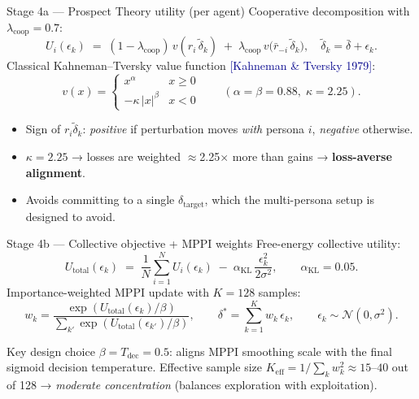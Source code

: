 \documentclass[10pt,aspectratio=169]{beamer}
\newcommand{\cit}[1]{{\scriptsize\textcolor{darkblue}{[#1]}}}
\begin{document}
\begin{frame}{Stage 4a — Prospect Theory utility (per agent)}
  Cooperative decomposition with $\lambda_\text{coop}=0.7$:
  \[
    U_i(\epsilon_k) \;=\; (1-\lambda_\text{coop})\,v(r_i\,\tilde\delta_k)
    \;+\; \lambda_\text{coop}\,v\!\bigl(\bar r_{-i}\,\tilde\delta_k\bigr),\quad
    \tilde\delta_k = \bar\delta + \epsilon_k.
  \]
  Classical Kahneman--Tversky value function \cit{Kahneman \& Tversky 1979}:
  \[
    v(x) =
    \begin{cases}
      x^\alpha & x\ge 0 \\
      -\kappa\,|x|^\beta & x < 0
    \end{cases}
    \qquad (\alpha=\beta=0.88,\;\kappa=2.25).
  \]
  \begin{itemize}
    \item Sign of $r_i\tilde\delta_k$: \emph{positive} if perturbation moves \emph{with} persona $i$, \emph{negative} otherwise.
    \item $\kappa = 2.25$ → losses are weighted $\approx$2.25$\times$ more than gains → \textbf{loss-averse alignment}.
    \item Avoids committing to a single $\delta_\text{target}$, which the multi-persona setup is designed to avoid.
  \end{itemize}
\end{frame}

\begin{frame}{Stage 4b — Collective objective + MPPI weights}
  Free-energy collective utility:
  \[
    U_\text{total}(\epsilon_k) \;=\; \frac{1}{N}\sum_{i=1}^N U_i(\epsilon_k)
    \;-\; \alpha_\text{KL}\,\frac{\epsilon_k^2}{2\sigma^2},
    \qquad \alpha_\text{KL}=0.05.
  \]
  Importance-weighted MPPI update with $K=128$ samples:
  \[
    w_k = \frac{\exp(U_\text{total}(\epsilon_k)/\beta)}{\sum_{k'} \exp(U_\text{total}(\epsilon_{k'})/\beta)},
    \qquad
    \delta^\ast = \sum_{k=1}^{K} w_k\,\epsilon_k,\qquad
    \epsilon_k\sim\mathcal{N}(0,\sigma^2).
  \]
  \begin{block}{Key design choice}
    $\beta = T_\text{dec} = 0.5$: aligns MPPI smoothing scale with the final sigmoid decision temperature.
    Effective sample size $K_\text{eff} = 1/\sum_k w_k^2 \approx 15\text{--}40$ out of 128 → \emph{moderate concentration} (balances exploration with exploitation).
  \end{block}
\end{frame}
\end{document}
